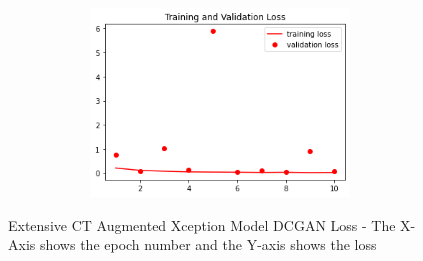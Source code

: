  \begin{figure}[H]
    \centering
    \includegraphics[width=1\textwidth,height=5cm,keepaspectratio]{Images/XceptionBaselineTrainingValidationLossExtensiveCTAugmentedDCGAN.png}\\
    \caption{Extensive CT Augmented Xception Model DCGAN Loss - The X-Axis shows the epoch number and the Y-axis shows the loss}
    \label{fig:Extensive CT Augmented Xception Model DCGAN Loss}
\end{figure}

